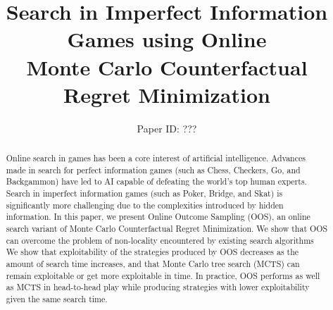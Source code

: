 \documentclass[letterpaper]{article}
\begin{document}
%
\title{Search in Imperfect Information Games using Online\\Monte Carlo Counterfactual Regret Minimization}

\author{Paper ID: ???}



\maketitle

\begin{abstract}
Online search in games has been a core interest of artificial intelligence. 
Advances made in search for perfect information games (such as Chess, Checkers, Go, 
and Backgammon) have led to AI capable of defeating the world's top human experts. 
Search in imperfect information games (such as Poker, Bridge, and Skat) is significantly 
more challenging due to the complexities introduced by hidden information.  
In this paper, we present Online Outcome Sampling (OOS), 
an online search variant of Monte Carlo Counterfactual Regret Minimization.
We show that OOS can overcome the problem of non-locality encountered by existing 
search algorithms 
We show that exploitability of the strategies produced by OOS decreases as
the amount of search time increases, and that Monte Carlo tree search (MCTS) can remain exploitable
or get more exploitable in time. In practice, OOS performs as well as MCTS in head-to-head play 
while producing strategies with lower exploitability given the same search time.
\end{abstract}
\end{document}
